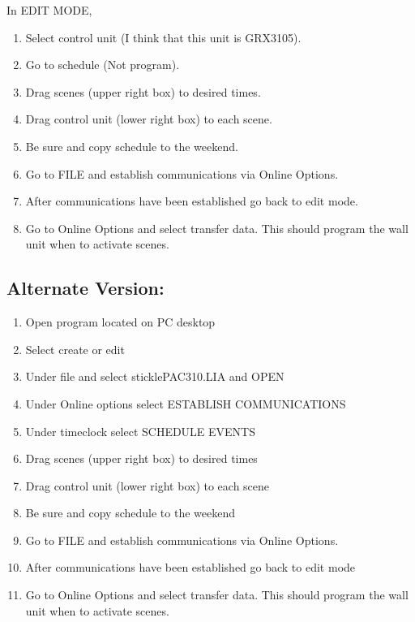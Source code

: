 \documentclass[
  letterpaper,
  DIV=11,
  numbers=noendperiod]{scrreprt}
\providecommand{\tightlist}{%
  \setlength{\itemsep}{0pt}\setlength{\parskip}{0pt}}\usepackage{longtable,booktabs,array}
\begin{document}
In EDIT MODE,

\begin{enumerate}
\def\labelenumi{\arabic{enumi}.}
\tightlist
\item
  Select control unit (I think that this unit is GRX3105).
\item
  Go to schedule (Not program).
\item
  Drag scenes (upper right box) to desired times.
\item
  Drag control unit (lower right box) to each scene.
\item
  Be sure and copy schedule to the weekend.
\item
  Go to FILE and establish communications via Online Options.
\item
  After communications have been established go back to edit mode.
\item
  Go to Online Options and select transfer data. This should program the
  wall unit when to activate scenes.
\end{enumerate}

\hypertarget{alternate-version}{%
\subsection{Alternate Version:}\label{alternate-version}}

\begin{enumerate}
\def\labelenumi{\arabic{enumi}.}
\tightlist
\item
  Open program located on PC desktop
\item
  Select create or edit
\item
  Under file and select sticklePAC310.LIA and OPEN
\item
  Under Online options select ESTABLISH COMMUNICATIONS
\item
  Under timeclock select SCHEDULE EVENTS
\item
  Drag scenes (upper right box) to desired times
\item
  Drag control unit (lower right box) to each scene
\item
  Be sure and copy schedule to the weekend
\item
  Go to FILE and establish communications via Online Options.
\item
  After communications have been established go back to edit mode
\item
  Go to Online Options and select transfer data. This should program the
  wall unit when to activate scenes.
\end{enumerate}
\end{document}
